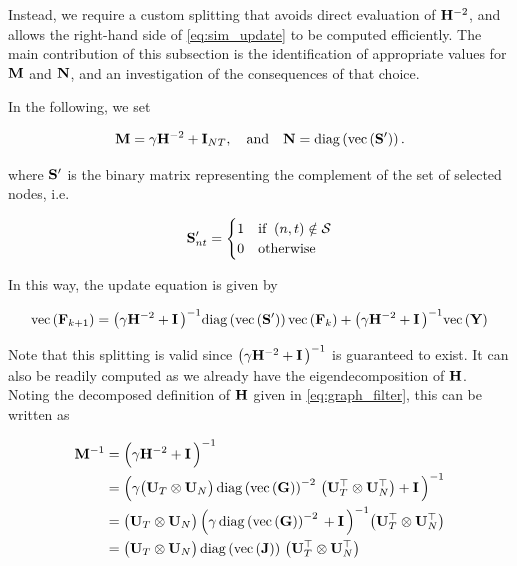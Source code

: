 Instead, we require a custom splitting that avoids direct evaluation of $\mathbf{H}^{-2}$, and allows the right-hand side of \cref{eq:sim_update} to be computed efficiently. The main contribution of this subsection is the identification of appropriate values for $\mathbf{M}$ and $\mathbf{N}$, and an investigation of the consequences of that choice. 

In the following, we set 

\begin{equation}
    \mathbf{M} = \gamma \mathbf{H}^{-2} + \mathbf{I}_{NT}, \quad \text{and} \quad \mathbf{N} = \text{\textup{diag}}\left(\text{\textup{vec}}\left(\mathbf{S}'\right)\right).
\end{equation}

where $\mathbf{S}'$ is the binary matrix representing the complement of the set of selected nodes, i.e.

\begin{equation}
    \label{eq:S_}
    \mathbf{S}'_{nt} = \begin{cases}
        1 & \text{if} \;\; (n, t) \notin \mathcal{S} \\
        0 & \text{otherwise}
    \end{cases}
\end{equation}

In this way, the update equation is given by 

\begin{equation}
    \label{eq:sim_update2}
    \text{\textup{vec}}\left(\mathbf{F}_{k+1}\right) = \big(\gamma \mathbf{H}^{-2} + \mathbf{I} \, \big)^{-1}  \text{\textup{diag}}\left(\text{\textup{vec}}\left(\mathbf{S}'\right)\right) \text{\textup{vec}}\left(\mathbf{F}_{k}\right) + \big(\gamma \mathbf{H}^{-2} + \mathbf{I} \, \big)^{-1} \text{\textup{vec}}\left(\mathbf{Y}\right)
\end{equation}



Note that this splitting is valid since $\big(\gamma\mathbf{H}^{-2} + \mathbf{I} \, \big)^{-1}$ is guaranteed to exist. It can also be readily computed as we already have the eigendecomposition of $\mathbf{H}$. Noting the decomposed definition of $\mathbf{H}$ given in \cref{eq:graph_filter}, this can be written as

\begin{align}
    \label{eq:M_inv}
    \mathbf{M}^{-1} & = \Big( \gamma \mathbf{H}^{-2} + \mathbf{I} \, \Big)^{-1} \notag \\
            & = \Big( \gamma \big(\mathbf{U}_T \otimes \mathbf{U}_N\big)\, \text{\textup{diag}}\left(\text{\textup{vec}}\left(\mathbf{G}\right)\right)^{-2}\,  \big(\mathbf{U}_T^\top \otimes \mathbf{U}_N^\top\big)  + \mathbf{I} \, \Big)^{-1} \notag   \\
            & = \big(\mathbf{U}_T \otimes \mathbf{U}_N\big)\, \Big( \gamma \, \text{\textup{diag}}\left(\text{\textup{vec}}\left(\mathbf{G}\right)\right)^{-2}\,    + \mathbf{I} \, \Big)^{-1} \big(\mathbf{U}_T^\top \otimes \mathbf{U}_N^\top\big) \notag \\
            & = \big(\mathbf{U}_T \otimes \mathbf{U}_N\big)\, \text{\textup{diag}}\left(\text{\textup{vec}}\left(\mathbf{J}\right)\right)\,  \big(\mathbf{U}_T^\top \otimes \mathbf{U}_N^\top\big)
\end{align}

